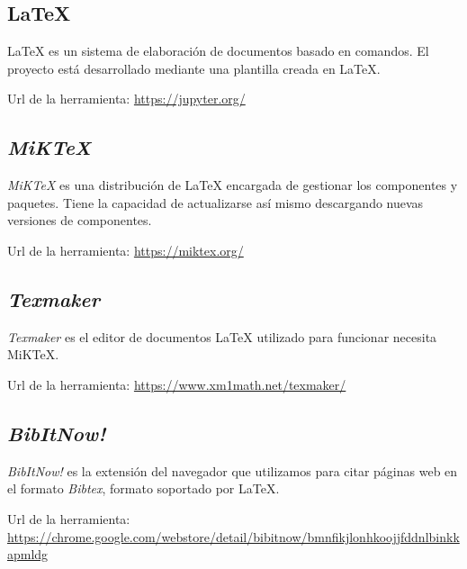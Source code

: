 \subsection{\LaTeX}
\LaTeX{} es un sistema de elaboración de documentos basado en comandos. El proyecto está desarrollado mediante una plantilla creada en \LaTeX.

Url de la herramienta: \url{https://jupyter.org/}

\subsection{\textit{MiKTeX}}
\textit{MiKTeX} es una distribución de \LaTeX{} encargada de gestionar los componentes y paquetes. Tiene la capacidad de actualizarse así mismo descargando nuevas versiones de componentes.

Url de la herramienta: \url{https://miktex.org/}

\subsection{\textit{Texmaker}}
\textit{Texmaker} es el editor de documentos \LaTeX{} utilizado para funcionar necesita MiKTeX.

Url de la herramienta: \url{https://www.xm1math.net/texmaker/}

\subsection{\textit{BibItNow!}}
\textit{BibItNow!} es la extensión del navegador que utilizamos para citar páginas web en el formato \textit{Bibtex}, formato soportado por \LaTeX.

Url de la herramienta: \url{https://chrome.google.com/webstore/detail/bibitnow/bmnfikjlonhkoojjfddnlbinkkapmldg}
